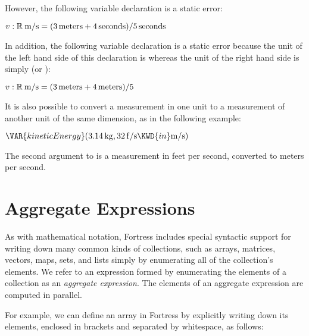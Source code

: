 However, the following variable declaration is a static error:

\begin{Fortress}
\(v \mathrel{\mathtt{:}} \mathbb{R}\mskip 4mu plus 4mu\mathrm{m}/\mathrm{s} = (3\,\mathrm{meters} + 4\,\mathrm{seconds}) / 5\,\mathrm{seconds}\)
\end{Fortress}

In addition, the following variable declaration is a static error
because the unit of the left hand side of this declaration
is 
whereas the unit of the right hand side
is simply  (or ):

\begin{Fortress}
\(v \mathrel{\mathtt{:}} \mathbb{R}\mskip 4mu plus 4mu\mathrm{m}/\mathrm{s} = (3\,\mathrm{meters} + 4\,\mathrm{meters}) / 5\)
\end{Fortress}

It is also possible to convert a measurement in one unit to
a measurement of another unit of the same dimension,
as in the following example:

\begin{Fortress}
\(\VAR{kineticEnergy}(3.14\,\mathrm{kg}, 32\,\mathrm{f}/\mathrm{s} \KWD{in} \mathrm{m}/\mathrm{s})\)
\end{Fortress}

The second argument to  is a measurement in
feet per second,
converted to meters per second.

\section{Aggregate Expressions}
As with mathematical notation, Fortress includes special syntactic support for
writing down many common kinds of collections, such as arrays, matrices, vectors, maps, sets, and lists
simply by enumerating all of the collection's elements.
We refer to an expression formed by enumerating the elements of a
collection as an \emph{aggregate expression}.
The elements of an aggregate expression are computed in parallel.

For example, we can define an array  in Fortress by explicitly writing down its elements, enclosed in brackets
and separated by whitespace, as follows:

